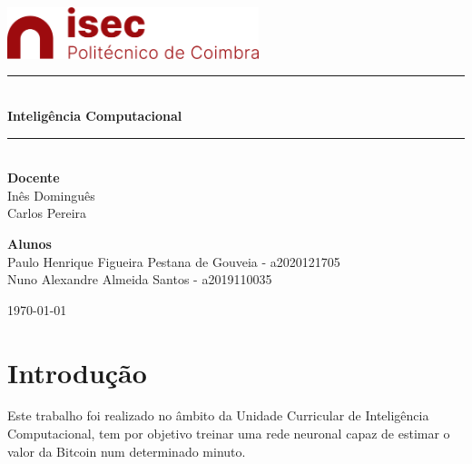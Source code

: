 \documentclass[10pt]{article}
\newcommand{\HRule}{\rule{\linewidth}{0.5mm}}
\begin{document}
\begin{titlepage}
\begin{center}

\includegraphics[width=0.55\textwidth]{img/logo-isec-transparente.png}~\\[2cm]


\HRule \\[0.4cm]
{ \LARGE 
  \textbf{Inteligência Computacional}\\[0.4cm]
}
\HRule \\[1.5cm]

{ \large
  \textbf{Docente} \\[0.1cm]
  Inês Dominguês \\ Carlos Pereira \\[2.5cm]
}


{ \large
  \textbf{Alunos} \\[0.1cm]
  Paulo Henrique Figueira Pestana de Gouveia - a2020121705 \\[0.1cm]
  Nuno Alexandre Almeida Santos - a2019110035\\[0.1cm]
}

\vfill



{\large \today}
 
\end{center}
\end{titlepage}


\newpage



\tableofcontents
{}
\newpage
\setcounter{page}{1}

\large
\section{Introdução}\label{sec:intro}
Este trabalho foi realizado no âmbito da Unidade Curricular 
de Inteligência Computacional, tem por objetivo treinar uma rede 
neuronal capaz de estimar o valor da Bitcoin num determinado minuto.
\end{document}
